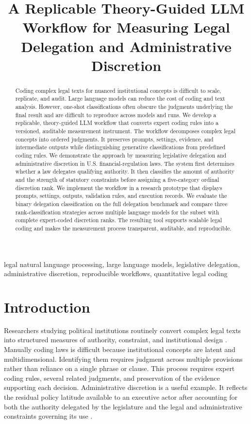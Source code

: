 \documentclass[conference]{IEEEtran}
\title{A Replicable Theory-Guided LLM Workflow for Measuring Legal Delegation and Administrative Discretion}
\author{\IEEEauthorblockN{Anonymous Authors}}
\begin{document}
\maketitle

\begin{abstract}

Coding complex legal texts for nuanced institutional concepts is difficult to scale, replicate, and audit. Large language models can reduce the cost of coding and text analysis. However, one-shot classifications often obscure the judgments underlying the final result and are difficult to reproduce across models and runs. We develop a replicable, theory-guided LLM workflow that converts expert coding rules into a versioned, auditable measurement instrument. The workflow decomposes complex legal concepts into ordered judgments. It preserves prompts, settings, evidence, and intermediate outputs while distinguishing generative classifications from predefined coding rules. We demonstrate the approach by measuring legislative delegation and administrative discretion in U.S. financial-regulation laws. The system first determines whether a law delegates qualifying authority. It then classifies the amount of authority and the strength of statutory constraints before assigning a five-category ordinal discretion rank. We implement the workflow in a research prototype that displays prompts, settings, outputs, validation rules, and execution records. We evaluate the binary delegation classification on the full delegation benchmark and compare three rank-classification strategies across multiple language models for the subset with complete expert-coded discretion ranks. The resulting tool supports scalable legal coding and makes the measurement process transparent, auditable, and reproducible.
\end{abstract}

\begin{IEEEkeywords}
legal natural language processing, large language models, legislative delegation, administrative discretion, reproducible workflows, quantitative legal coding
\end{IEEEkeywords}

\section{Introduction}

Researchers studying political institutions routinely convert complex legal texts into structured measures of authority, constraint, and institutional design \citep{grimmer2013text}. Manually coding laws is difficult because institutional concepts are latent and multidimensional. Identifying them requires judgment across multiple provisions rather than reliance on a single phrase or clause. This process requires expert coding rules, several related judgments, and preservation of the evidence supporting each decision. Administrative discretion is a useful example. It reflects the residual policy latitude available to an executive actor after accounting for both the authority delegated by the legislature and the legal and administrative constraints governing its use \citep{epstein1999delegating,ohalloran2015banking}.
\end{document}
